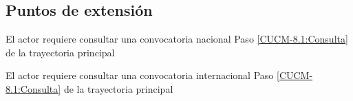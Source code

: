 	\subsection{Puntos de extensión}
	
	\UCExtensionPoint
	{El actor requiere consultar una convocatoria nacional}
	{ Paso \ref{CUCM-8.1:Consulta} de la trayectoria principal}
	{}
	
	\UCExtensionPoint
	{El actor requiere consultar una convocatoria internacional}
	{ Paso \ref{CUCM-8.1:Consulta} de la trayectoria principal}
	{}
